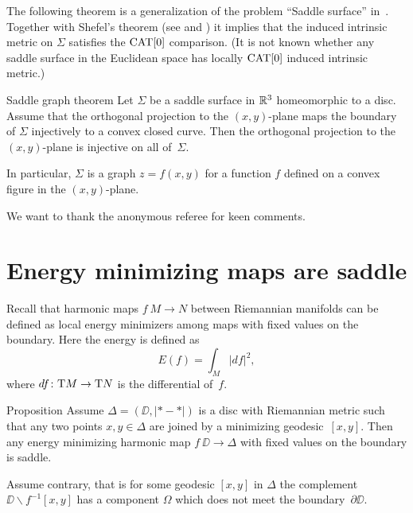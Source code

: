 \documentclass{article}
\begin{document}
The following theorem is a generalization of the problem ``Saddle surface'' in~\cite{petrunin-orthodox}.
Together with Shefel's theorem (see \cite{shefel-3D} and \cite[4.5.5]{akp}) it implies that the induced 
intrinsic metric on $\Sigma$ satisfies the $\mathop{\rm CAT}\nolimits[0]$ comparison. 
(It is not known whether any saddle surface in the Euclidean space has locally $\mathop{\rm CAT}\nolimits[0]$ induced intrinsic metric.)

\begin{thm}{Saddle graph theorem}\label{cor:projection}
Let $\Sigma$ be a saddle surface in $\mathbb{R}^3$ homeomorphic to a disc.
Assume that the orthogonal projection to the $(x,y)$-plane
maps the boundary of $\Sigma$
injectively to a convex closed curve.
Then the orthogonal projection to the $(x,y)$-plane is injective on all of~$\Sigma$.

In particular, $\Sigma$ is a graph $z=f(x,y)$ for a function $f$ defined on a convex figure in the $(x,y)$-plane.
\end{thm}

\medskip

We want to thank the anonymous referee for keen comments.

\section{Energy minimizing maps are saddle}

Recall that harmonic maps $f\:M\to N$ between Riemannian manifolds can be defined as local energy minimizers 
among maps with fixed values on the boundary.
Here the energy is defined as 
\[E(f)=\int_M|df|^2,\]
where $df\colon\mathrm{T} M\to \mathrm{T} N$ is the differential of~$f$.

\begin{thm}{Proposition} 
Assume $\Delta=(\DD,|{*}-{*}|)$ is a disc with Riemannian metric such that any two points $x,y\in\Delta$ are joined by a minimizing geodesic~$[x,y]$.
Then any energy minimizing harmonic map $f\:\DD\to\Delta$ with fixed values on the boundary is saddle.
\end{thm}

Assume contrary, that is for some geodesic $[x,y]$ in $\Delta$ the complement $\DD\backslash f^{-1}[x,y]$ has a component 
$\Omega$ which does not meet the boundary~$\partial\DD$.
\end{document}
